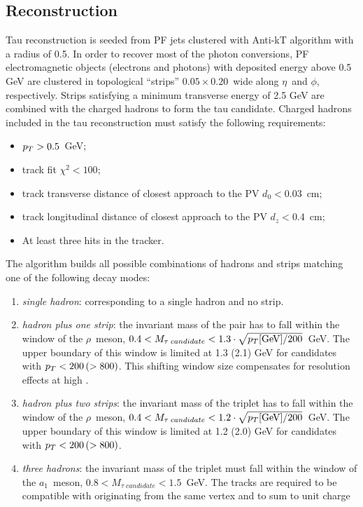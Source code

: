\subsection{Reconstruction}

Tau reconstruction is seeded from PF jets clustered with Anti-kT algorithm with a radius of 0.5. In order to recover most of the photon conversions, PF electromagnetic objects (electrons and photons) with deposited energy above 0.5 GeV are clustered in topological ``strips'' $0.05 \times 0.20$\ wide along $\eta$\ and $\phi$, respectively. Strips satisfying a minimum transverse energy of 2.5 GeV are combined with the charged hadrons to form the tau candidate. Charged hadrons included in the tau reconstruction must satisfy the following requirements:

\begin{itemize}
\item $p_{T} > 0.5$\ GeV;
\item track fit $\chi^2 < 100$;
\item track transverse distance of closest approach to the PV $d_0 < 0.03$\ cm;
\item track longitudinal distance of closest approach to the PV $d_z < 0.4$\ cm;
\item At least three hits in the tracker.
\end{itemize}

The algorithm builds all possible combinations of hadrons and strips matching one of the following decay modes:

\begin{enumerate}
\item \emph{single hadron}: corresponding to a single hadron and no strip.
\item \emph{hadron plus one strip}: the invariant mass of the pair has to fall within the window of the $\rho$\ meson, $0.4 < M_{\tau \; candidate} < 1.3 \cdot \sqrt{p_{T} \mathrm{[GeV]} / 200}$\ GeV. The upper boundary of this window is limited at 1.3 (2.1) GeV for candidates with $p_{T} < 200 \, (> 800)$. This shifting window size compensates for resolution effects at high \pT.
\item \emph{hadron plus two strips}: the invariant mass of the triplet has to fall within the window of the $\rho$\ meson, $0.4 < M_{\tau \; candidate} < 1.2 \cdot \sqrt{p_{T} \mathrm{[GeV]} / 200}$\ GeV. The upper boundary of this window is limited at 1.2 (2.0) GeV for candidates with $p_{T} < 200 \, (> 800)$.
\item \emph{three hadrons}: the invariant mass of the triplet must fall within the window of the $a_1$\ meson, $0.8 < M_{\tau \; candidate} < 1.5$\ GeV. The tracks are required to be compatible with originating from the same vertex and to sum to unit charge
\end{enumerate}

